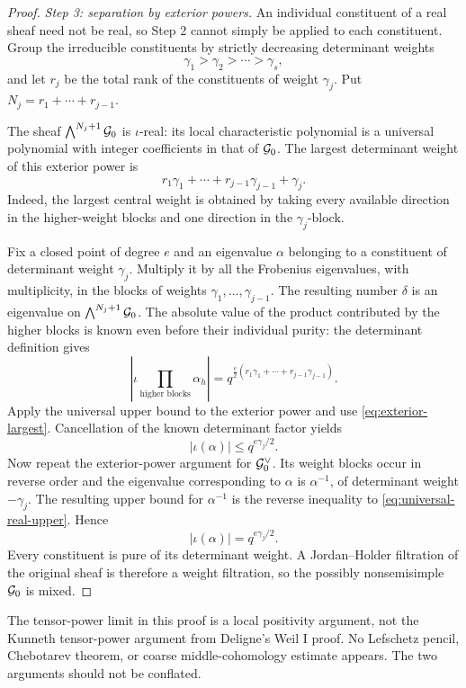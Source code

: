 \begin{proof}
\medskip
\noindent\emph{Step 3: separation by exterior powers.}
An individual constituent of a real sheaf need not be real, so Step 2
cannot simply be applied to each constituent.  Group the irreducible
constituents by strictly decreasing determinant weights
\[
  \gamma_1>\gamma_2>\cdots>\gamma_s,
\]
and let \(r_j\) be the total rank of the constituents of weight
\(\gamma_j\).  Put \(N_j=r_1+\cdots+r_{j-1}\).

The sheaf \(\bigwedge^{N_j+1}\mathcal G_0\) is \(\iota\)-real: its local
characteristic polynomial is a universal polynomial with integer
coefficients in that of \(\mathcal G_0\).  The largest determinant weight of
this exterior power is
\[
  r_1\gamma_1+\cdots+r_{j-1}\gamma_{j-1}+\gamma_j.
\tag{9.3}
\label{eq:exterior-largest}
\]
Indeed, the largest central weight is obtained by taking every available
direction in the higher-weight blocks and one direction in the
\(\gamma_j\)-block.

Fix a closed point of degree \(e\) and an eigenvalue \(\alpha\) belonging
to a constituent of determinant weight \(\gamma_j\).  Multiply it by all
the Frobenius eigenvalues, with multiplicity, in the blocks of weights
\(\gamma_1,\ldots,\gamma_{j-1}\).  The resulting number \(\delta\) is an
eigenvalue on \(\bigwedge^{N_j+1}\mathcal G_0\).  The absolute value of the
product contributed by the higher blocks is known even before their
individual purity: the determinant definition gives
\[
 \left|\iota\prod_{\text{higher blocks}}\alpha_h\right|
 =
 q^{\frac e2(r_1\gamma_1+\cdots+r_{j-1}\gamma_{j-1})}.
\]
Apply the universal upper bound to the exterior power and use
\eqref{eq:exterior-largest}.  Cancellation of the known determinant
factor yields
\[
  |\iota(\alpha)|\leq q^{e\gamma_j/2}.
\tag{9.4}
\]
Now repeat the exterior-power argument for \(\mathcal G_0^\vee\).  Its weight
blocks occur in reverse order and the eigenvalue corresponding to
\(\alpha\) is \(\alpha^{-1}\), of determinant weight \(-\gamma_j\).
The resulting upper bound for \(\alpha^{-1}\) is the reverse inequality
to \eqref{eq:universal-real-upper}.  Hence
\[
  |\iota(\alpha)|=q^{e\gamma_j/2}.
\]
Every constituent is pure of its determinant weight.  A Jordan--Holder
filtration of the original sheaf is therefore a weight filtration, so
the possibly nonsemisimple \(\mathcal G_0\) is mixed.
\end{proof}

\begin{remark}
The tensor-power limit in this proof is a local positivity argument, not
the Kunneth tensor-power argument from Deligne's Weil I proof.  No
Lefschetz pencil, Chebotarev theorem, or coarse middle-cohomology estimate
appears.  The two arguments should not be conflated.
\end{remark}

